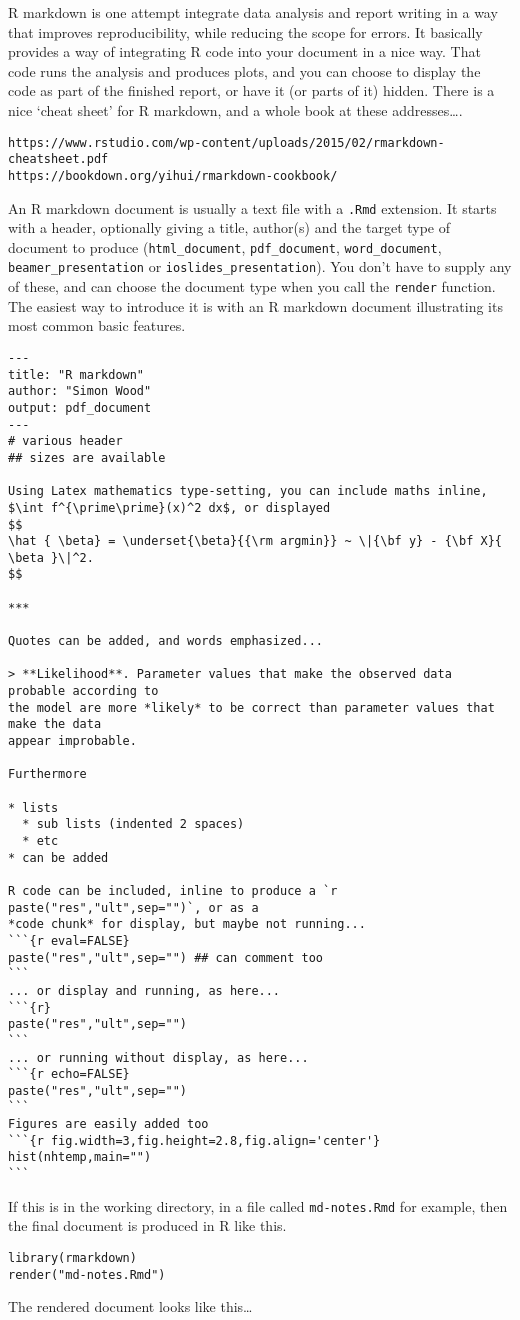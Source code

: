 \documentclass[10pt] {article}
\theoremstyle{definition}
\begin{document}
R markdown is one attempt integrate data analysis and report writing in a way that improves reproducibility, while reducing the scope for errors. It basically provides a way of integrating R code into your document in a nice way. That code runs the analysis and produces plots, and you can choose to display the code as part of the finished report, or have it (or parts of it) hidden. There is a nice `cheat sheet' for R markdown, and a whole book at these addresses\ldots.
\begin{lstlisting}
https://www.rstudio.com/wp-content/uploads/2015/02/rmarkdown-cheatsheet.pdf
https://bookdown.org/yihui/rmarkdown-cookbook/
\end{lstlisting}
An R markdown document is usually a text file with a {\tt .Rmd} extension. It starts with a header, optionally giving a title, author(s) and the target type of document to produce (\lstinline+html_document+, \lstinline+pdf_document+, \lstinline+word_document+, \lstinline+beamer_presentation+ or \lstinline+ioslides_presentation+). You don't have to supply any of these, and can choose the document type when you call the {\tt render} function. 
The easiest way to introduce it is with an R markdown document illustrating its most common basic features. 
\begin{lstlisting}
---
title: "R markdown"
author: "Simon Wood"
output: pdf_document
---
# various header
## sizes are available 

Using Latex mathematics type-setting, you can include maths inline, 
$\int f^{\prime\prime}(x)^2 dx$, or displayed
$$
\hat { \beta} = \underset{\beta}{{\rm argmin}} ~ \|{\bf y} - {\bf X}{ \beta }\|^2.
$$

***

Quotes can be added, and words emphasized...

> **Likelihood**. Parameter values that make the observed data probable according to 
the model are more *likely* to be correct than parameter values that make the data 
appear improbable.

Furthermore

* lists
  * sub lists (indented 2 spaces)
  * etc
* can be added

R code can be included, inline to produce a `r paste("res","ult",sep="")`, or as a 
*code chunk* for display, but maybe not running...
```{r eval=FALSE}
paste("res","ult",sep="") ## can comment too
```
... or display and running, as here...
```{r} 
paste("res","ult",sep="")
```
... or running without display, as here...
```{r echo=FALSE} 
paste("res","ult",sep="")
```
Figures are easily added too
```{r fig.width=3,fig.height=2.8,fig.align='center'}
hist(nhtemp,main="")
```
\end{lstlisting}
If this is in the working directory, in a file called {\tt md-notes.Rmd} for example, then the final document is produced in R like this.
\begin{lstlisting}
library(rmarkdown)
render("md-notes.Rmd")
\end{lstlisting}
The rendered document looks like this\ldots
\end{document}
